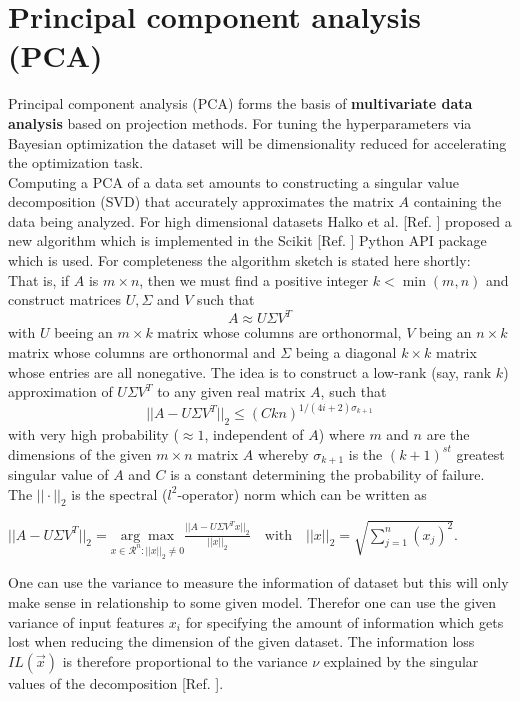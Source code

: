 \documentclass[12pt, a4paper]{article}
\begin{document}
\section{Principal component analysis (PCA)}
\label{sec: pca}
Principal component analysis (PCA) forms the basis of \textbf{multivariate data analysis} based on projection methods. For tuning the hyperparameters via Bayesian optimization the dataset will be dimensionality reduced for accelerating the optimization task. \\
Computing a PCA of a data set amounts to constructing a singular value decomposition (SVD) that accurately approximates the matrix $A$ containing the data being analyzed.
For high dimensional datasets Halko et al. [Ref. \cite{Halko2011}] proposed a new algorithm which is implemented in the Scikit [Ref. \cite{Scikit2023}] Python API package which is used.
For completeness the algorithm sketch is stated here shortly: \\
That is, if $A$ is $m \times n$, then we must find a positive integer $k < \min(m,n)$ and construct matrices $U, \Sigma$ and $V$ such that
\begin{equation}
    A \approx U \Sigma V^T
\end{equation}
with $U$ beeing an $m \times k$ matrix whose columns are orthonormal, $V$ being an $n \times k$ matrix whose columns are orthonormal and $\Sigma$ being a diagonal $k \times k$ matrix whose entries are all nonegative. 
The idea is to construct a low-rank (say, rank $k$) approximation of $U \Sigma V^T$ to any given real matrix $A$, such that
\begin{equation}
    ||A - U \Sigma V^T||_2 \leq (Ckn)^{1/(4i+2) \sigma_{k+1}}
\end{equation}
with very high probability ($\approx 1$, independent of $A$) where $m$ and $n$ are the dimensions of the given $m \times n$ matrix $A$ whereby $\sigma_{k+1}$ is the $(k + 1)^{st}$ greatest singular value of $A$ and $C$ is a constant determining the probability of failure. The $|| \cdot ||_2$ is the spectral ($l^2$-operator) norm which can be written as
\begin{center}
    $
    ||A - U \Sigma V^T||_2 = \underset{x \in \mathcal{R}^n : ||x||_2 \neq 0}{\arg\max} \frac{||A - U \Sigma V^T x ||_2}{||x||_2}
    \quad \text{with} \quad ||x||_2 = \sqrt{\sum_{j=1}^n(x_j)^2}.
    $
\end{center}
One can use the variance to measure the information of dataset but this will only make sense in relationship to some given model. Therefor one can use the given variance of input features $x_i$ for specifying the amount of information which gets lost when reducing the dimension of the given dataset. The information loss $IL(\vec{x})$ is therefore proportional to the variance $\nu$ explained by the singular values of the decomposition [Ref. \cite{Scikit2023}]. 
\end{document}
